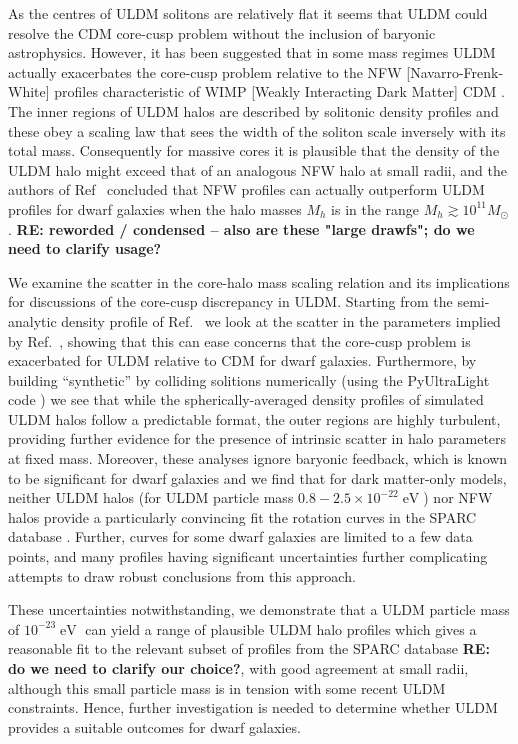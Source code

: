 \documentclass[a4paper,11pt]{article}
\newcommand{\re}[1]{{{\bf \color{green} RE: #1}}}
\begin{document}
As the  centres of ULDM solitons are relatively flat it seems that ULDM could  resolve the CDM core-cusp problem without the inclusion of baryonic astrophysics. However, it has  been suggested that in some mass regimes ULDM actually exacerbates the core-cusp problem relative to the NFW [Navarro-Frenk-White] profiles  \cite{Navarro:1995iw} characteristic of WIMP [Weakly Interacting Dark Matter] CDM \cite{Robles:2018fur}. The inner regions of ULDM halos are described by solitonic density profiles and these obey a scaling law that sees the width of the soliton scale inversely with its total mass.  Consequently for massive cores it is plausible that the density of the ULDM halo might exceed that of an analogous NFW halo at small radii, and the authors of Ref~\cite{Robles:2018fur} concluded that NFW profiles can actually outperform ULDM profiles for dwarf galaxies when the halo masses $M_h$ is in the range $M_h \gtrsim 10^{11} M_{\odot}$.  \re{reworded / condensed -- also are these "large drawfs"; do we need to clarify usage?}

We examine the scatter in the core-halo mass scaling relation and its implications for discussions of the core-cusp discrepancy in ULDM. Starting from the semi-analytic density profile of Ref.~\cite{Robles:2018fur} we look at the scatter in the parameters implied by Ref.~\cite{Schive:2014hza}, showing that this can ease concerns that the core-cusp problem is  exacerbated for ULDM relative to CDM for dwarf galaxies. Furthermore, by building ``synthetic'' by colliding solitions numerically (using the {\sc PyUltraLight} code  \cite{Edwards:2018ccc}) we see that while the spherically-averaged density profiles of simulated ULDM halos follow a predictable format, the outer regions are highly turbulent, providing further evidence for the presence of intrinsic scatter in halo parameters at fixed mass. Moreover, these analyses ignore baryonic feedback, which is known to be significant for dwarf galaxies \cite{2018MNRAS.473.5698D, Benitez-Llambay:2018}  and we find that for dark matter-only models, neither ULDM halos (for ULDM particle mass $0.8-2.5\times 10^{-22} \operatorname{eV}$)
nor NFW halos provide a particularly convincing fit the rotation curves in the SPARC database \cite{Lelli:2016zqa}. Further, curves for some dwarf galaxies are limited to  a few data points, and many profiles having significant uncertainties further complicating attempts to draw robust conclusions from this approach. 

These uncertainties notwithstanding, we demonstrate that a ULDM particle mass of $10^{-23}\operatorname{eV}$ can yield a range of plausible ULDM halo profiles which gives a reasonable fit to the relevant subset of profiles from the SPARC database \re{do we need to clarify our choice?}, with good agreement at small radii, although this  small particle mass is in tension with some recent ULDM constraints. Hence, further investigation is needed to determine whether ULDM provides a suitable outcomes for dwarf galaxies.  
\end{document}
